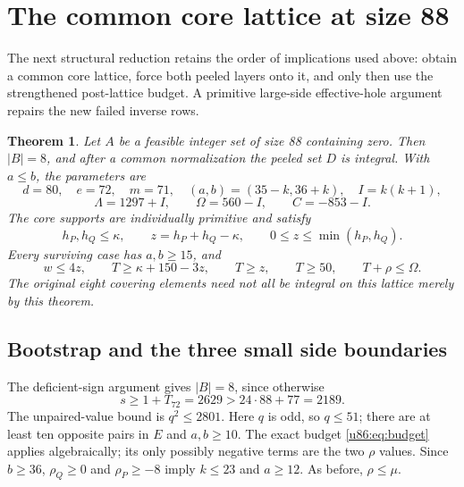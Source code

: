 \documentclass[11pt,a4paper]{article}
\newtheorem{theorem}{Theorem}[section]
\theoremstyle{remark}
\begin{document}
\section{The common core lattice at size 88}\label{u86:sec:lattice88}
The next structural reduction retains the order of implications used
above: obtain a common core lattice, force both peeled layers onto it,
and only then use the strengthened post-lattice budget. A primitive
large-side effective-hole argument repairs the new failed inverse rows.

\begin{theorem}\label{u86:thm:lattice88}
Let $A$ be a feasible integer set of size 88 containing zero. Then
$|B|=8$, and after a common normalization the peeled set $D$ is integral.
With $a\le b$, the parameters are
\[
 d=80,\quad e=72,\quad m=71,\quad
 (a,b)=(35-k,36+k),\quad I=k(k+1),
\]
\[
 \Lambda=1297+I,\qquad\Omega=560-I,\qquad C=-853-I.
\]
The core supports are individually primitive and satisfy
\[
 h_P,h_Q\le\kappa,\qquad z=h_P+h_Q-\kappa,
 \qquad0\le z\le\min(h_P,h_Q).
\]
Every surviving case has $a,b\ge15$, and
\begin{equation}\label{u86:eq:budget88}
 w\le4z,\qquad T\ge\kappa+150-3z,\qquad
 T\ge z,\qquad T\ge50,\qquad T+\rho\le\Omega.
\end{equation}
The original eight covering elements need not all be integral on this
lattice merely by this theorem.
\end{theorem}

\subsection{Bootstrap and the three small side boundaries}
The deficient-sign argument gives $|B|=8$, since otherwise
\[
 s\ge1+T_{72}=2629>24\cdot88+77=2189.
\]
The unpaired-value bound is $q^2\le2801$. Here $q$ is odd, so $q\le51$;
there are at least ten opposite pairs in $E$ and $a,b\ge10$.
The exact budget \eqref{u86:eq:budget} applies algebraically; its only
possibly negative terms are the two $\rho$ values. Since $b\ge36$,
$\rho_Q\ge0$ and $\rho_P\ge-8$ imply $k\le23$ and $a\ge12$.
As before, $\rho\le\mu$.
\end{document}
